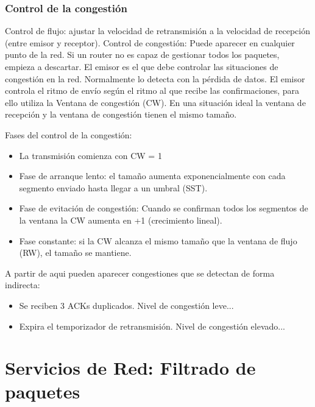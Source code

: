 \subsubsection{Control de la congestión}
Control de flujo: ajustar la velocidad de retransmisión a la velocidad de recepción (entre emisor y receptor).
Control de congestión: Puede aparecer en cualquier punto de la red. Si un router no es capaz de gestionar todos los paquetes, empieza a descartar. El emisor es el que debe controlar las situaciones de congestión en la red. Normalmente lo detecta con la pérdida de datos.
El emisor controla el ritmo de envío según el ritmo al que recibe las confirmaciones, para ello utiliza la Ventana de congestión (CW). En una situación ideal la ventana de recepción y la ventana de congestión tienen el mismo tamaño.

Fases del control de la congestión:
\begin{itemize}
    \item La transmisión comienza con CW = 1
    \item Fase de arranque lento: el tamaño aumenta exponencialmente con cada segmento enviado hasta llegar a un umbral (SST).
    \item Fase de evitación de congestión: Cuando se confirman todos los segmentos de la ventana la CW aumenta en +1 (crecimiento lineal).
    \item Fase constante: si la CW alcanza el mismo tamaño que la ventana de flujo (RW), el tamaño se mantiene.
\end{itemize}
A partir de aqui pueden aparecer congestiones que se detectan de forma indirecta:
\begin{itemize}
    \item Se reciben 3 ACKs duplicados. Nivel de congestión leve...
    \item Expira el temporizador de retransmisión. Nivel de congestión elevado...
\end{itemize}
\section{Servicios de Red: Filtrado de paquetes}
